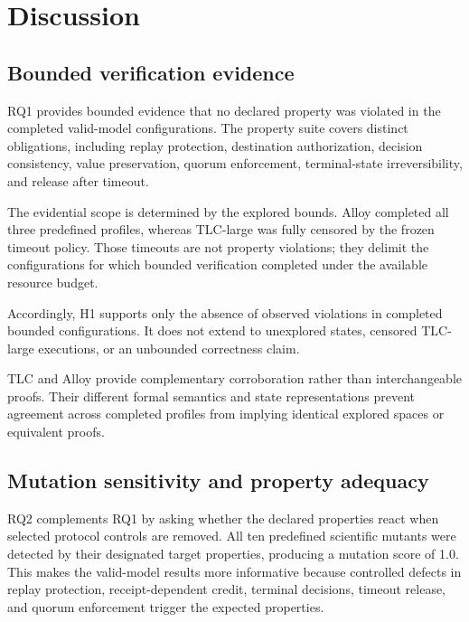 \section{Discussion}
\label{sec:discussion}

\subsection{Bounded verification evidence}
\label{subsec:discussion-bounded-verification}

RQ1 provides bounded evidence that no declared property was violated in the
completed valid-model configurations. The property suite covers distinct
obligations, including replay protection, destination authorization, decision
consistency, value preservation, quorum enforcement, terminal-state
irreversibility, and release after timeout.

The evidential scope is determined by the explored bounds. Alloy completed all
three predefined profiles, whereas TLC-large was fully censored by the frozen
timeout policy. Those timeouts are not property violations; they delimit the
configurations for which bounded verification completed under the available
resource budget.

Accordingly, H1 supports only the absence of observed violations in completed
bounded configurations. It does not extend to unexplored states, censored
TLC-large executions, or an unbounded correctness claim.

TLC and Alloy provide complementary corroboration rather than interchangeable
proofs. Their different formal semantics and state representations prevent
agreement across completed profiles from implying identical explored spaces or
equivalent proofs.

\subsection{Mutation sensitivity and property adequacy}
\label{subsec:discussion-mutation}

RQ2 complements RQ1 by asking whether the declared properties react when
selected protocol controls are removed. All ten predefined scientific mutants
were detected by their designated target properties, producing a mutation score
of 1.0. This makes the valid-model results more informative because controlled
defects in replay protection, receipt-dependent credit, terminal decisions,
timeout release, and quorum enforcement trigger the expected properties.

